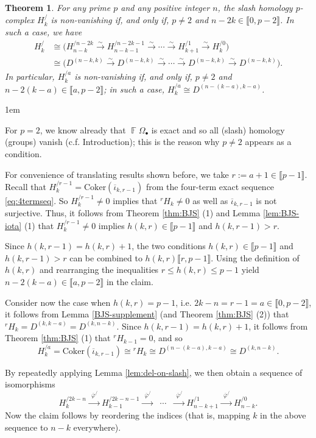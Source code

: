 \documentclass[a4paper]{amsart}
\makeatletter
\numberwithin{equation}{subsection}
\newtheorem{theorem}{Theorem}[section]
\theoremstyle{definition}
\DeclareMathOperator{\F}{\mathbb{F}}
\newcommand{\interval}[1]{\llbracket #1 \rrbracket}
\renewenvironment{proof}[1][\proofname]{\par
	\pushQED{\qed}%
	\normalfont \topsep0\p@\@plus6\p@ \labelsep1em\relax
	\trivlist
	\item[\hskip\labelsep\bfseries #1]\ignorespaces
	\mbox{}%
}{
	\popQED\endtrivlist\@endpefalse
}
\numberwithin{equation}{subsection}
\makeatother
\begin{document}
\begin{theorem}\label{thm:newfinal}
For any prime $p$ and any positive integer $n$, the slash homology $p$-complex $H_k^/$ is non-vanishing if, and only if, $p\neq 2$ and $n-2k\in\interval{0, p-2}$.  In such a case, we have
\begin{align*}
H_k^{/} &\cong  \big( H_{n-k}^{/n-2k} \xrightarrow{\sim} H_{n-k-1}^{/n-2k-1} \xrightarrow{\sim} \cdots \xrightarrow{\sim} H_{k+1}^{/1} \xrightarrow{\sim} H_k^{/0} \big) \\
&\cong \big( D^{(n-k,k)} \xrightarrow{\sim} D^{(n-k,k)} \xrightarrow{\sim} \cdots \xrightarrow{\sim} D^{(n-k,k)}\xrightarrow{\sim} D^{(n-k,k)}\big).
\end{align*}
In particular, $H_k^{/a}$ is non-vanishing if, and only if, $p\neq2$ and  $n-2(k-a)\in\interval{a,p-2}$; in such a case, $H_k^{\slash a}\cong D^{(n-(k-a), k-a)}$.
\end{theorem}
\begin{proof}
For $p=2$, we know already that $\F\Omega_\bullet$ is exact and so all (slash) homology (groups) vanish (c.f. Introduction); this is the reason why $p\neq 2$ appears as a condition.

For convenience of translating results shown before, we take $r:=a+1\in\interval{p-1}$.  
Recall that $H_k^{\slash r-1} = \mathrm{Coker}(\overline{\iota}_{k,r-1})$ from the four-term exact sequence \eqref{eq:4termseq}.  So $H_k^{\slash r-1}\neq 0$ implies that ${}^rH_k\neq 0$ as well as $\overline{\iota}_{k,r-1}$ is not surjective.  Thus, it follows from Theorem \ref{thm:BJS} (1) and Lemma \ref{lem:BJS-iota} (1) that $H_k^{\slash r-1}\neq 0$ implies $h(k,r) \in\interval{p-1}$ and $h(k,r-1)>r$.

Since $h(k,r-1)=h(k,r)+1$, the two conditions $h(k,r) \in\interval{p-1}$ and $h(k,r-1)>r$ can be combined to $h(k,r)\interval{r,p-1}$.  Using the definition of $h(k,r)$ and rearranging the inequalities $r\leq h(k,r)\leq p-1$ yield $n-2(k-a)\in\interval{a,p-2}$ in the claim.

Consider now the case when $h(k,r)=p-1$, i.e. $2k-n=r-1=a\in\interval{0,p-2}$, it  follows from  Lemma \ref{BJS-supplement} (and Theorem \ref{thm:BJS} (2)) that ${}^rH_k = D^{(k,k-a)} = D^{(k, n-k)}$.  Since $h(k,r-1)=h(k,r)+1$, it follows from Theorem \ref{thm:BJS} (1) that ${}^rH_{k-1}=0$, and so \[
H_k^{\slash a}=\mathrm{Coker}(\overline{\iota}_{k,r-1}) \cong {}^rH_k \cong D^{(n-(k-a),k-a)} \cong D^{(k,n-k)}.
\]

By repeatedly applying Lemma \ref{lem:del-on-slash}, we then obtain a sequence of isomorphisms
\[
H_{k}^{\slash 2k-n} \xrightarrow{\;\,\overline{\varphi}^{\slash}\;}  H_{k-1}^{\slash 2k-n-1} \xrightarrow{\;\,\overline{\varphi}^{\slash}\;} \;\; \cdots \;\;\xrightarrow{\;\,\overline{\varphi}^{\slash}\;}   H_{n-k+1}^{\slash 1} \xrightarrow{\;\,\overline{\varphi}^{\slash}\;} H_{n-k}^{\slash 0}.
\]
Now the claim follows by reordering the indices (that is, mapping $k$ in the above sequence to $n-k$ everywhere).
\end{proof}
\end{document}
